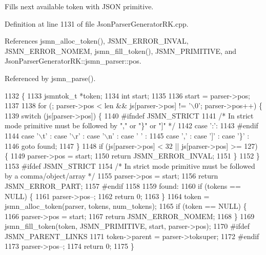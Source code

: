Fills next available token with J\+S\+ON primitive. 

Definition at line 1131 of file Json\+Parser\+Generator\+R\+K.\+cpp.



References jsmn\+\_\+alloc\+\_\+token(), J\+S\+M\+N\+\_\+\+E\+R\+R\+O\+R\+\_\+\+I\+N\+V\+AL, J\+S\+M\+N\+\_\+\+E\+R\+R\+O\+R\+\_\+\+N\+O\+M\+EM, jsmn\+\_\+fill\+\_\+token(), J\+S\+M\+N\+\_\+\+P\+R\+I\+M\+I\+T\+I\+VE, and Json\+Parser\+Generator\+R\+K\+::jsmn\+\_\+parser\+::pos.



Referenced by jsmn\+\_\+parse().


\begin{DoxyCode}
1132                                                           \{
1133     jsmntok\_t *token;
1134     \textcolor{keywordtype}{int} start;
1135 
1136     start = parser->pos;
1137 
1138     \textcolor{keywordflow}{for} (; parser->pos < len && js[parser->pos] != \textcolor{charliteral}{'\(\backslash\)0'}; parser->pos++) \{
1139         \textcolor{keywordflow}{switch} (js[parser->pos]) \{
1140 \textcolor{preprocessor}{#ifndef JSMN\_STRICT}
1141             \textcolor{comment}{/* In strict mode primitive must be followed by "," or "\}" or "]" */}
1142             \textcolor{keywordflow}{case} \textcolor{charliteral}{':'}:
1143 \textcolor{preprocessor}{#endif}
1144             \textcolor{keywordflow}{case} \textcolor{charliteral}{'\(\backslash\)t'} : \textcolor{keywordflow}{case} \textcolor{charliteral}{'\(\backslash\)r'} : \textcolor{keywordflow}{case} \textcolor{charliteral}{'\(\backslash\)n'} : \textcolor{keywordflow}{case} \textcolor{charliteral}{' '} :
1145             \textcolor{keywordflow}{case} \textcolor{charliteral}{','}  : \textcolor{keywordflow}{case} \textcolor{charliteral}{']'}  : \textcolor{keywordflow}{case} \textcolor{charliteral}{'\}'} :
1146                 \textcolor{keywordflow}{goto} found;
1147         \}
1148         \textcolor{keywordflow}{if} (js[parser->pos] < 32 || js[parser->pos] >= 127) \{
1149             parser->pos = start;
1150             \textcolor{keywordflow}{return} JSMN_ERROR_INVAL;
1151         \}
1152     \}
1153 \textcolor{preprocessor}{#ifdef JSMN\_STRICT}
1154     \textcolor{comment}{/* In strict mode primitive must be followed by a comma/object/array */}
1155     parser->pos = start;
1156     \textcolor{keywordflow}{return} JSMN_ERROR_PART;
1157 \textcolor{preprocessor}{#endif}
1158 
1159 found:
1160     \textcolor{keywordflow}{if} (tokens == NULL) \{
1161         parser->pos--;
1162         \textcolor{keywordflow}{return} 0;
1163     \}
1164     token = jsmn_alloc_token(parser, tokens, num\_tokens);
1165     \textcolor{keywordflow}{if} (token == NULL) \{
1166         parser->pos = start;
1167         \textcolor{keywordflow}{return} JSMN_ERROR_NOMEM;
1168     \}
1169     jsmn_fill_token(token, JSMN_PRIMITIVE, start, parser->pos);
1170 \textcolor{preprocessor}{#ifdef JSMN\_PARENT\_LINKS}
1171     token->parent = parser->toksuper;
1172 \textcolor{preprocessor}{#endif}
1173     parser->pos--;
1174     \textcolor{keywordflow}{return} 0;
1175 \}
\end{DoxyCode}

